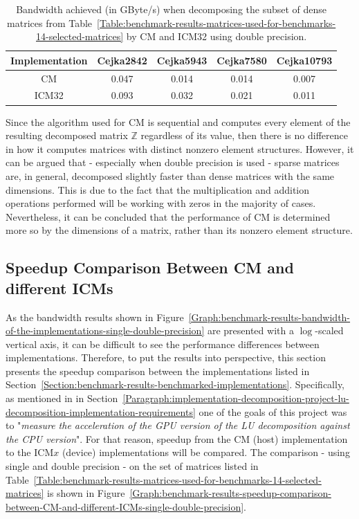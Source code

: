 \begin{table}[ht!]
	\centering
	\renewcommand{\arraystretch}{1.5}
	\begin{tabular}{ |c|c|c|c|c| } 
		\hline
		Implementation & Cejka2842 & Cejka5943 & Cejka7580 & Cejka10793 \\
		\hline
		CM             &     0.047 &     0.014 &     0.014 & 0.007      \\
		\hline
		ICM32          &     0.093 &     0.032 &     0.021 & 0.011      \\
		\hline
	\end{tabular}
	\caption{Bandwidth achieved (in GByte/s) when decomposing the subset of dense matrices from Table~\ref{Table:benchmark-results-matrices-used-for-benchmarks-14-selected-matrices} by CM and ICM32 using double precision.}
	\label{Table:benchmark-results-bandwidth-of-the-implementations-dense-matrices-bandwidth}
\end{table}

Since the algorithm used for CM is sequential and computes every element of the resulting decomposed matrix $ \mathbb{Z} $ regardless of its value, then there is no difference in how it computes matrices with distinct nonzero element structures. However, it can be argued that - especially when double precision is used - sparse matrices are, in general, decomposed slightly faster than dense matrices with the same dimensions. This is due to the fact that the multiplication and addition operations performed will be working with zeros in the majority of cases. Nevertheless, it can be concluded that the performance of CM is determined more so by the dimensions of a matrix, rather than its nonzero element structure.


\subsection{Speedup Comparison Between CM and different ICMs \TO}\label{Subsection:benchmark-results-speedup-comparison-between-CM-and-different-ICMs}
As the bandwidth results shown in Figure~\ref{Graph:benchmark-results-bandwidth-of-the-implementations-single-double-precision} are presented with a $ \log $-scaled vertical axis, it can be difficult to see the performance differences between implementations. Therefore, to put the results into perspective, this section presents the speedup comparison between the implementations listed in Section~\ref{Section:benchmark-results-benchmarked-implementations}. Specifically, as mentioned in \textit{} in Section~\ref{Paragraph:implementation-decomposition-project-lu-decomposition-implementation-requirements} one of the goals of this project was to "\textit{measure the acceleration of the GPU version of the LU decomposition against the CPU version}". For that reason, speedup from the CM (host) implementation to the ICM$ x $ (device) implementations will be compared. The comparison - using single and double precision - on the set of matrices listed in Table~\ref{Table:benchmark-results-matrices-used-for-benchmarks-14-selected-matrices} is shown in Figure~\ref{Graph:benchmark-results-speedup-comparison-between-CM-and-different-ICMs-single-double-precision}.

